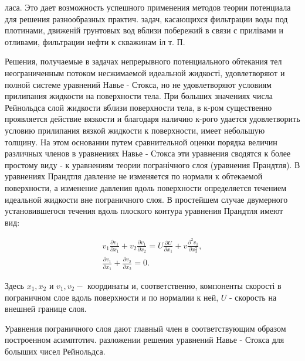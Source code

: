 \documentclass[10pt]{article}
\begin{document}
ласа. Это дает возможность успешного применения методов теории потенциала для решения разнообразных практич. задач, касающихся фильтрации воды под плотинами, движеній грунтовых вод вблизи побережий в связи с прилівами и отливами, фильтрации нефти к скважинам іл т. П.



Решения, получаемые в задачах непрерывного потенциального обтекания тел неограниченным потоком несжимаемой идеальной жидкості, удовлетворяют и полной системе уравнений Навье - Стокса, но не удовлетворяют условиям прилипания жидкости на поверхности тела. При больших значениях числа Рейнольдса слой жидкости вблизи поверхности тела, в к-ром существенно проявляется действие вязкости и благодаря наличию к-рого удается удовлетворить условию прилипания вязкой жидкости к поверхности, имеет небольшую толщину. На этом основании путем сравнительной оценки порядка величин различных членов в уравнениях Навье - Стокса эти уравнения сводятся к более простому виду - к уравнениям теории погранічного слоя (уравнения Прандтля). В уравнениях Прандтля давление не изменяется по нормали к обтекаемой поверхности, а изменение давления вдоль поверхности определяется течением идеальной жидкости вне пограничного слоя. В простейшем случае двумерного установившегося течения вдоль плоского контура уравнения Прандтля имеют вид:



\[

\begin{gathered}

v_{1} \frac{\partial v_{1}}{\partial x_{1}}+v_{2} \frac{\partial v_{1}}{\partial x_{2}}=U \frac{\partial U}{\partial x_{1}}+v \frac{\partial^{2} v_{1}}{\partial x_{2}^{2}}, \\

\frac{\partial v_{1}}{\partial x_{1}}+\frac{\partial v_{2}}{\partial x_{2}}=0 .

\end{gathered}

\]



Здесь $x_{1}, x_{2}$ и $v_{1}, v_{2}-$ координаты и, соответственно, компоненты скорості в пограничном слое вдоль поверхности и по нормалии к ней, $U$ - скорость на внешней границе слоя.



Уравнения пограничного слоя дают главный член в соответствующим образом построенном асимптотич. разложении решения уравнений Навье - Стокса для болыших чисел Рейнольдса.
\end{document}
